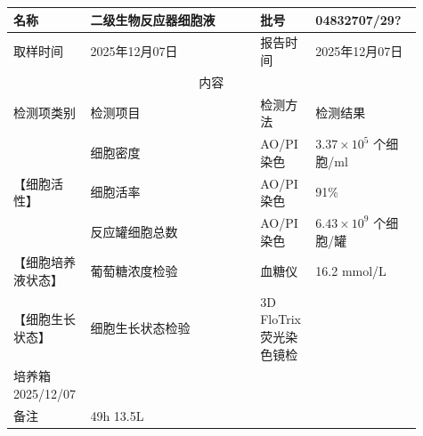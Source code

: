 \documentclass[UTF8,10pt,a4paper,fontset=fandol]{ctexart}
\newcommand{\fieldvalue}[1]{#1}
\newcommand{\handwritten}[1]{#1}
\begin{document}
\begin{tabular}{|p{0.13\linewidth}|p{0.40\linewidth}|p{0.13\linewidth}|p{0.25\linewidth}|}
\hline
名称 &
\fieldvalue{二级生物反应器细胞液} &
批号 &
\fieldvalue{\handwritten{04832707/29?}}\\
\hline
取样时间 &
\fieldvalue{\handwritten{2025年12月07日}} &
报告时间 &
\fieldvalue{\handwritten{2025年12月07日}}\\
\hline
\multicolumn{4}{|c|}{内容}\\
\hline
检测项类别 & 检测项目 & 检测方法 & 检测结果\\
\hline
\multirow{3}{*}{【细胞活性】}
& 细胞密度 & AO/PI染色 &
\fieldvalue{\handwritten{$3.37\times10^{5}$ 个细胞/ml}}\\
\cline{2-4}
& 细胞活率 & AO/PI染色 &
\fieldvalue{\handwritten{91\%}}\\
\cline{2-4}
& 反应罐细胞总数 & AO/PI染色 &
\fieldvalue{\handwritten{$6.43\times10^{9}$ 个细胞/罐}}\\
\hline
【细胞培养液状态】 & 葡萄糖浓度检验 & 血糖仪 &
\fieldvalue{\handwritten{16.2 mmol/L}}\\
\hline
\multirow{1}{*}{【细胞生长状态】}
& 细胞生长状态检验 &
3D FloTrix荧光染色镜检 &
\begin{minipage}[c]{0.25\linewidth}
\centering
\fbox{\rule{0pt}{3.0cm}\rule{0.9\linewidth}{0pt}}\\[-2pt]
\handwritten{培养箱 2025/12/07}
\end{minipage}\\
\hline
备注 &
\multicolumn{3}{l|}{
\fieldvalue{\handwritten{49h 13.5L}}
}\\
\hline
\end{tabular}
\end{document}
